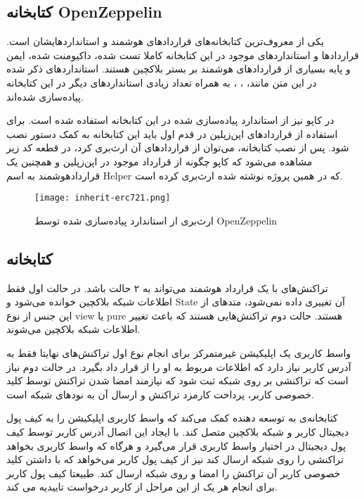 \subsection{کتابخانه OpenZeppelin}
یکی از معروف‌ترین کتابخانه‌های قراردادهای هوشمند و استانداردهایشان است. قراردادها و استانداردهای موجود در این کتابخانه کاملا تست شده، داکیومنت شده، ایمن و پایه بسیاری از قراردادهای هوشمند بر بستر بلاکچین هستند.
استانداردهای ذکر شده در این متن مانند،
،
،
به همراه تعداد زیادی استانداردهای دیگر در این کتابخانه پیاده‌سازی شده‌اند.

در کاپو نیز از استاندارد
پیاده‌سازی شده در این کتابخانه استفاده شده است. برای استفاده از قرارداد‌های اپن‌زپلین در قدم اول باید این کتابخانه به کمک دستور
نصب شود. پس از نصب کتابخانه، می‌توان از قراردادهای آن ارث‌بری کرد، در قطعه کد زیر مشاهده می‌شود که کاپو چگونه از قرارداد
موجود در اپن‌زپلین و همچنین یک قراردادهوشمند به اسم Helper که در همین پروژه نوشته شده ارث‌بری کرده است.

\begin{figure}[ht]
\centerline{\texttt{[image: inherit-erc721.png]}}
\caption{ارث‌بری از استاندارد  پیاده‌سازی شده توسط OpenZeppelin}
\label{fig:inherit-erc721}
\end{figure}

\subsection{کتابخانه }
تراکنش‌های با یک قرارداد هوشمند می‌تواند به ۲ حالت باشد. در حالت اول فقط اطلاعات شبکه بلاکچین خوانده می‌شود و
\gls{State}
آن تغییری داده نمی‌شود، متدهای از این جنس از نوع view یا pure هستند. حالت دوم تراکنش‌هایی هستند که باعث تغییر اطلاعات شبکه بلاکچین می‌شوند.

واسط کاربری یک اپلیکیشن غیرمتمرکز برای انجام نوع اول تراکنش‌های نهایتا فقط به آدرس کاربر نیاز دارد که اطلاعات مربوط به او را از قرار داد بگیرد. در حالت دوم نیاز است که تراکنشی بر روی شبکه ثبت شود که نیازمند امضا شدن تراکنش توسط کلید خصوصی کاربر، پرداخت کارمزد تراکنش و ارسال آن به نودهای شبکه است.

کتابخانه‌ی
به توسعه دهنده کمک می‌کند که واسط کاربری اپلیکیشن را به کیف پول دیجیتال کاربر و شبکه بلاکچین متصل کند. با ایجاد این اتصال آدرس کاربر توسط کیف پول دیجیتال در اختیار واسط کاربری قرار می‌گیرد و هرگاه که واسط کاربری بخواهد تراکنشی را روی شبکه ارسال کند نیز از کیف پول کاربر می‌خواهد که با داشتن کلید خصوصی کاربر آن تراکنش را امضا و روی شبکه ارسال کند. طبیعتا کیف پول کاربر برای انجام هر یک از این مراحل از کاربر درخواست تاییدیه می کند.


